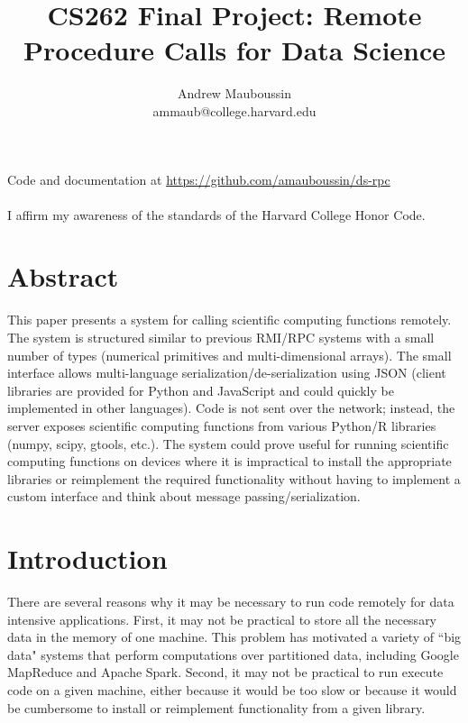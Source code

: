 \documentclass[11pt]{article}
\title{CS262 Final Project: Remote Procedure Calls for Data Science}
\author{Andrew Mauboussin \\ ammaub@college.harvard.edu}
\begin{document}
\maketitle{}

Code and documentation at \textcolor{blue}{ \href{https://github.com/amauboussin/ds-rpc}{https://github.com/amauboussin/ds-rpc}}\\\\
\indent I affirm my awareness of the standards of the Harvard College Honor Code.



\section{Abstract}
This paper presents a system for calling scientific computing functions remotely. The system is structured similar to previous RMI/RPC systems with a small number of types (numerical primitives and multi-dimensional arrays). The small interface allows multi-language serialization/de-serialization using JSON (client libraries are provided for Python and JavaScript and could quickly be implemented in other languages). Code is not sent over the network; instead, the server exposes scientific computing functions from various Python/R libraries (numpy, scipy, gtools, etc.). The system could prove useful for running scientific computing functions on devices where it is impractical to install the appropriate libraries or reimplement the required functionality  without having to implement a custom interface and think about message passing/serialization. 

\section{Introduction}

There are several reasons why it may be necessary to run code remotely for data intensive applications. First, it may not be practical to store all the necessary data in the memory of one machine. This problem has motivated a variety of ``big data" systems that perform computations over partitioned data, including Google MapReduce and Apache Spark. Second, it may not be practical to run execute code on a given machine, either because it would be too slow or because it would be cumbersome to install or reimplement functionality from a given library. 
\end{document}
